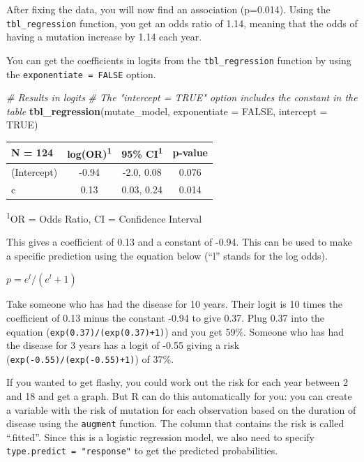 \documentclass[]{book}
\newenvironment{Shaded}{\begin{snugshade}}{\end{snugshade}}
\newcommand{\CommentTok}[1]{\textcolor[rgb]{0.56,0.35,0.01}{\textit{#1}}}
\newcommand{\DataTypeTok}[1]{\textcolor[rgb]{0.13,0.29,0.53}{#1}}
\newcommand{\KeywordTok}[1]{\textcolor[rgb]{0.13,0.29,0.53}{\textbf{#1}}}
\newcommand{\NormalTok}[1]{#1}
\newcommand{\OtherTok}[1]{\textcolor[rgb]{0.56,0.35,0.01}{#1}}
\begin{document}
After fixing the data, you will now find an association (p=0.014). Using the \texttt{tbl\_regression} function, you get an odds ratio of 1.14, meaning that the odds of having a mutation increase by 1.14 each year.

You can get the coefficients in logits from the \texttt{tbl\_regression} function by using the \texttt{exponentiate\ =\ FALSE} option.

\begin{Shaded}
\begin{Highlighting}[]
\CommentTok{# Results in logits}
\CommentTok{# The "intercept = TRUE" option includes the constant in the table}
\KeywordTok{tbl_regression}\NormalTok{(mutate_model,}
               \DataTypeTok{exponentiate =} \OtherTok{FALSE}\NormalTok{,}
               \DataTypeTok{intercept =} \OtherTok{TRUE}\NormalTok{)}
\end{Highlighting}
\end{Shaded}

\captionsetup[table]{labelformat=empty,skip=1pt}
\begin{longtable}{lccc}
\toprule
\textbf{N = 124} & \textbf{log(OR)}\textsuperscript{1} & \textbf{95\% CI}\textsuperscript{1} & \textbf{p-value} \\ 
\midrule
(Intercept) & -0.94 & -2.0, 0.08 & 0.076 \\ 
c & 0.13 & 0.03, 0.24 & 0.014 \\ 
\bottomrule
\end{longtable}
\vspace{-5mm}
\begin{minipage}{\linewidth}
\textsuperscript{1}OR = Odds Ratio, CI = Confidence Interval \\ 
\end{minipage}

This gives a coefficient of 0.13 and a constant of -0.94. This can be used to make a specific prediction using the equation below (``l'' stands for the log odds).

\(p = e^l / (e^l+1)\)

Take someone who has had the disease for 10 years. Their logit is 10 times the coefficient of 0.13 minus the constant -0.94 to give 0.37. Plug 0.37 into the equation (\texttt{exp(0.37)/(exp(0.37)+1)}) and you get 59\%. Someone who has had the disease for 3 years has a logit of -0.55 giving a risk (\texttt{exp(-0.55)/(exp(-0.55)+1)}) of 37\%.

If you wanted to get flashy, you could work out the risk for each year between 2 and 18 and get a graph. But R can do this automatically for you: you can create a variable with the risk of mutation for each observation based on the duration of disease using the \texttt{augment} function. The column that contains the risk is called ``.fitted''. Since this is a logistic regression model, we also need to specify \texttt{type.predict\ =\ "response"} to get the predicted probabilities.
\end{document}
